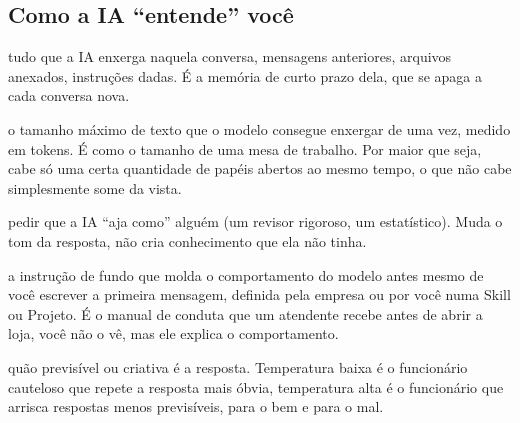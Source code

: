 \documentclass[11pt,a4paper]{article}
\begin{document}
\subsection*{Como a IA ``entende'' você}
\begin{description}[style=nextline,leftmargin=0pt,itemsep=6pt]
  \item[\poppinsmed\color{azulUNI}Contexto] tudo que a IA enxerga naquela conversa, mensagens anteriores, arquivos anexados, instruções dadas. É a memória de curto prazo dela, que se apaga a cada conversa nova.
  \item[\poppinsmed\color{azulUNI}Janela de contexto] o tamanho máximo de texto que o modelo consegue enxergar de uma vez, medido em tokens. É como o tamanho de uma mesa de trabalho. Por maior que seja, cabe só uma certa quantidade de papéis abertos ao mesmo tempo, o que não cabe simplesmente some da vista.
  \item[\poppinsmed\color{azulUNI}Papel/persona] pedir que a IA ``aja como'' alguém (um revisor rigoroso, um estatístico). Muda o tom da resposta, não cria conhecimento que ela não tinha.
  \item[\poppinsmed\color{azulUNI}System prompt] a instrução de fundo que molda o comportamento do modelo antes mesmo de você escrever a primeira mensagem, definida pela empresa ou por você numa Skill ou Projeto. É o manual de conduta que um atendente recebe antes de abrir a loja, você não o vê, mas ele explica o comportamento.
  \item[\poppinsmed\color{azulUNI}Temperatura] quão previsível ou criativa é a resposta. Temperatura baixa é o funcionário cauteloso que repete a resposta mais óbvia, temperatura alta é o funcionário que arrisca respostas menos previsíveis, para o bem e para o mal.
\end{description}
\end{document}
